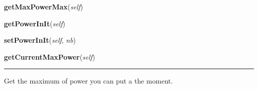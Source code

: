     \label{systems:System:getMaxPowerMax}

    \vspace{0.5ex}

\hspace{.8\funcindent}\begin{boxedminipage}{\funcwidth}

    \raggedright \textbf{getMaxPowerMax}(\textit{self})

\setlength{\parskip}{2ex}
\setlength{\parskip}{1ex}
    \end{boxedminipage}

    \label{systems:System:getPowerInIt}

    \vspace{0.5ex}

\hspace{.8\funcindent}\begin{boxedminipage}{\funcwidth}

    \raggedright \textbf{getPowerInIt}(\textit{self})

\setlength{\parskip}{2ex}
\setlength{\parskip}{1ex}
    \end{boxedminipage}

    \label{systems:System:setPowerInIt}

    \vspace{0.5ex}

\hspace{.8\funcindent}\begin{boxedminipage}{\funcwidth}

    \raggedright \textbf{setPowerInIt}(\textit{self}, \textit{nb})

\setlength{\parskip}{2ex}
\setlength{\parskip}{1ex}
    \end{boxedminipage}

    \label{systems:System:getCurrentMaxPower}

    \vspace{0.5ex}

\hspace{.8\funcindent}\begin{boxedminipage}{\funcwidth}

    \raggedright \textbf{getCurrentMaxPower}(\textit{self})

    \vspace{-1.5ex}

    \rule{\textwidth}{0.5\fboxrule}
\setlength{\parskip}{2ex}
    Get the maximum of power you can put a the moment.

\setlength{\parskip}{1ex}
    \end{boxedminipage}

